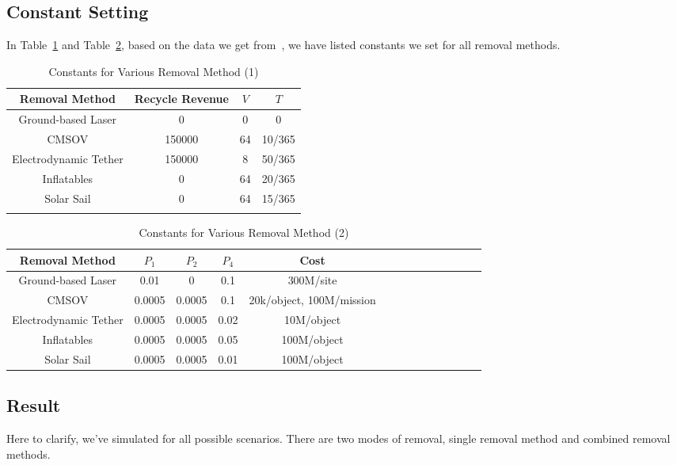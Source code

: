 \documentclass{mcmthesis}
\begin{document}
	\subsection{Constant Setting}
	In Table~\ref{Tab-Constant1} and Table~\ref{Tab-Constant2}, based on the data we get from~\cite{McKnight}, we have listed constants we set for all removal methods.
	\begin{table}[htbp]
		\centering
		\caption{Constants for Various Removal Method (1)} \label{Tab-Constant1}
		\begin{tabular}{cccc}
			\hline
			Removal Method &  Recycle Revenue & $V$ & $T$ \\
			\hline
			\hline
			Ground-based Laser &0 &0&0\\
			CMSOV 		        &150000 &64&10/365\\
			Electrodynamic Tether & 150000 &8&50/365\\
			Inflatables 	        & 0&64&20/365\\
			Solar Sail 	                & 0&64&15/365\\
			\hline
			\vspace{0.5pt}
		\end{tabular}
    \end{table}

    \begin{table}[htbp]
        \centering
		\caption{Constants for Various Removal Method (2)} \label{Tab-Constant2}
    	\begin{tabular}{cccccccccccccc}
			\hline
			Removal Method &  $P_1$ &$P_2$ &$P_4$ &Cost\\
			\hline
			\hline
			Ground-based Laser &0.01&0&0.1 & 300M/site\\
			CMSOV 		        &0.0005&0.0005&0.1 & 20k/object, 100M/mission\\
			Electrodynamic Tether &0.0005&0.0005&0.02 &10M/object\\
			Inflatables 	        &0.0005&0.0005&0.05&100M/object\\
			Solar Sail 	            &0.0005&0.0005&0.01&100M/object\\
			\hline
		\end{tabular}
	\end{table}	
	\subsection{Result}	
	Here to clarify, we've simulated for all possible scenarios. There are two modes of removal, single removal method and combined removal methods.
	
\end{document}
